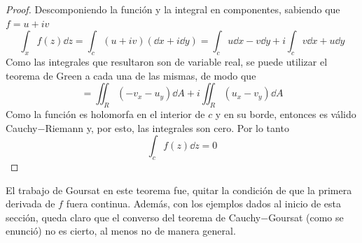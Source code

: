 \begin{proof}
	Descomponiendo la función y la integral en componentes, sabiendo que $f = u + iv$
		$$\int _x f(z) \dd{z} = \int _c (u+iv)(\dd{x} + i\dd{y}) = \int _c u\dd{x} - v\dd{y} + i\int _c v\dd{x} + u\dd{y}$$
	Como las integrales que resultaron son de variable real, se puede utilizar el teorema de Green a cada una de las mismas, de modo que
		$$ = \iint _R (-v_x - u_y) \dd{A} + i\iint _R (u_x - v_y) \dd{A}$$
	Como la función es holomorfa en el interior de $c$ y en su borde, entonces es válido Cauchy$-$Riemann y, por esto, las integrales son cero. Por lo tanto
		$$\int _c f(z) \dd{z} = 0$$
\end{proof}


El trabajo de Goursat en este teorema fue, quitar la condición de que la primera derivada de $f$ fuera continua. Además, con los ejemplos dados al inicio de esta sección, queda claro que el converso del teorema de Cauchy$-$Goursat (como se enunció) no es cierto, al menos no de manera general.


